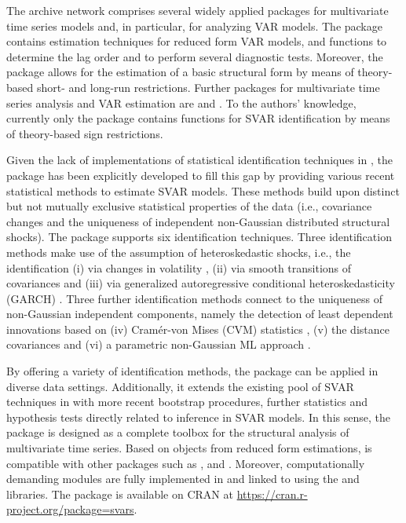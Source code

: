 \documentclass[nojss]{jss}\usepackage[]{graphicx}\usepackage[]{color}
\begin{document}
The  \citep{R} archive network comprises several widely applied packages for multivariate time series models and, in particular, for analyzing VAR models. The  package \citep{pfaff2008} contains estimation techniques for reduced form VAR models, and functions to determine the lag order and to perform several diagnostic tests. Moreover, the  package allows for the estimation of a basic structural form by means of theory-based short- and long-run restrictions. Further  packages for multivariate time series analysis and VAR estimation are  \citep{tsDyn} and  \citep{MTS}. To the authors' knowledge, currently only the  package \citep{VARsignR} contains functions for SVAR identification by means of theory-based sign restrictions.

Given the lack of implementations of statistical identification techniques in , the package  has been explicitly developed to fill this gap by providing various recent statistical methods to estimate SVAR models. These methods build upon distinct but not mutually exclusive statistical properties of the data (i.e., covariance changes and the uniqueness of independent non-Gaussian distributed structural shocks). The  package supports six identification techniques. Three identification methods make use of the assumption of heteroskedastic shocks, i.e., the identification (i)  via changes in volatility \citep{Rigobon2003}, (ii) via smooth transitions of covariances \citep{LUTKEPOHL201743} and (iii) via generalized autoregressive conditional heteroskedasticity (GARCH) \citep{NP2004, BouakezNormadin2010}. Three further identification methods connect to the uniqueness of non-Gaussian independent components, namely the   detection of least dependent innovations based on  (iv) Cram\'er-von Mises (CVM) statistics \citep{HerwartzLDI2018}, (v) the distance covariances  \citep{Matteson2017} and (vi) a parametric  non-Gaussian  ML approach \citep{LMS2017}.

By offering a variety of identification methods, the  package can be applied in diverse data settings. Additionally, it extends the existing pool of SVAR techniques in  with more recent bootstrap procedures, further statistics and hypothesis tests directly related to inference in SVAR models. In this sense, the  package is designed as a complete toolbox for the structural analysis of multivariate time series. Based on objects from reduced form estimations,  is compatible with other packages such as ,  and . Moreover, computationally demanding modules are fully implemented in  and linked to  using the  \citep{Rcpp} and \citep{arma2014} libraries. The package is available on CRAN at \href{https://cran.r-project.org/package=svars}{https://cran.r-project.org/package=svars}. \\
\end{document}
